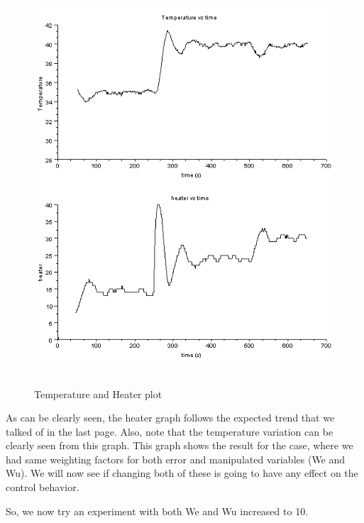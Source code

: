 \begin{figure}[H]
  \includegraphics[width=12cm, height=15cm]{mpc/1_1_heater_final.png}
  \caption{Temperature and Heater plot}
\end{figure}
As can be clearly seen, the heater graph follows the expected trend that we talked of in the last page. Also, note that the temperature variation can be clearly seen from this graph.
This graph shows the result for the case, where we had same weighting factors for both error and manipulated variables (We and Wu). We will now see if changing both of these is going to have any effect on the control behavior. 

So, we now try an experiment with both We and Wu increased to 10.


